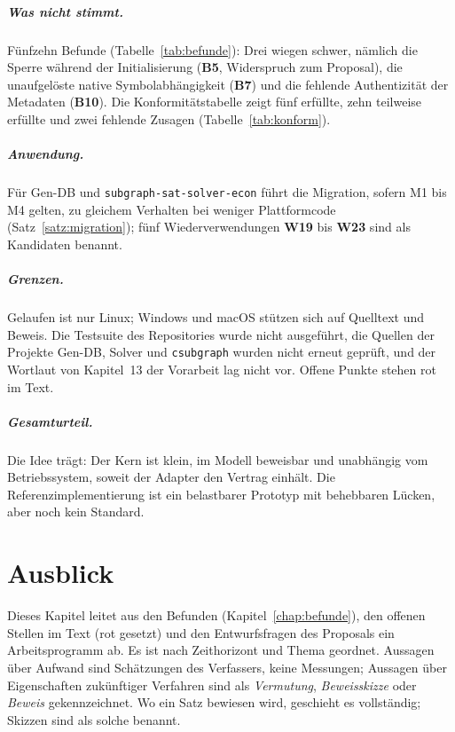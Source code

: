 \documentclass[a4paper,12pt,twoside]{report}
\DeclareRobustCommand{\_}{\ifmmode\mbox{\textunderscore}\else\textunderscore\allowbreak{}\fi}
\theoremstyle{definition}
\newcommand{\W}[1]{\textbf{W#1}}
\newcommand{\Bf}[1]{\textbf{B#1}}
\begin{document}
\paragraph{Was nicht stimmt.} Fünfzehn Befunde (Tabelle~\ref{tab:befunde}): Drei wiegen schwer, nämlich die Sperre während der Initialisierung (\Bf{5}, Widerspruch zum Proposal), die unaufgelöste native Symbolabhängigkeit (\Bf{7}) und die fehlende Authentizität der Metadaten (\Bf{10}). Die Konformitätstabelle zeigt fünf erfüllte, zehn teilweise erfüllte und zwei fehlende Zusagen (Tabelle~\ref{tab:konform}).

\paragraph{Anwendung.} Für Gen-DB und \texttt{subgraph-sat-solver-econ} führt die Migration, sofern M1 bis M4 gelten, zu gleichem Verhalten bei weniger Plattformcode (Satz~\ref{satz:migration}); fünf Wiederverwendungen \W{19} bis \W{23} sind als Kandidaten benannt.

\paragraph{Grenzen.} Gelaufen ist nur Linux; Windows und macOS stützen sich auf Quelltext und Beweis. Die Testsuite des Repositories wurde nicht ausgeführt, die Quellen der Projekte Gen-DB, Solver und \texttt{csubgraph} wurden nicht erneut geprüft, und der Wortlaut von Kapitel~13 der Vorarbeit lag nicht vor. Offene Punkte stehen rot im Text.

\paragraph{Gesamturteil.} Die Idee trägt: Der Kern ist klein, im Modell beweisbar und unabhängig vom Betriebssystem, soweit der Adapter den Vertrag einhält. Die Referenzimplementierung ist ein belastbarer Prototyp mit behebbaren Lücken, aber noch kein Standard.


\chapter{Ausblick}
\label{chap:ausblick}

Dieses Kapitel leitet aus den Befunden (Kapitel~\ref{chap:befunde}), den offenen Stellen im Text (rot gesetzt) und den Entwurfsfragen des Proposals ein Arbeitsprogramm ab. Es ist nach Zeithorizont und Thema geordnet. Aussagen über Aufwand sind Schätzungen des Verfassers, keine Messungen; Aussagen über Eigenschaften zukünftiger Verfahren sind als \emph{Vermutung}, \emph{Beweisskizze} oder \emph{Beweis} gekennzeichnet. Wo ein Satz bewiesen wird, geschieht es vollständig; Skizzen sind als solche benannt.
\end{document}
